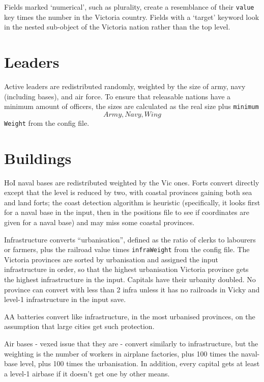 \documentclass[12pt,ebook,oneside]{book}
\begin{document}
Fields marked `numerical', such as plurality, create a resemblance of
their \texttt{value} key times the number in the Victoria
country. Fields with a `target' keyword look in the nested sub-object of
the Victoria nation rather than the top level. 

\section{Leaders}

Active leaders are redistributed randomly, weighted by the size of
army, navy (including bases), and air force. To ensure that releasable
nations have a minimum amount of officers, the sizes are calculated as
the real size plus \texttt{minimum\[Army,Navy,Wing\]Weight} from the
config file. 

\section{Buildings}

HoI naval bases are redistributed weighted by the Vic ones. Forts
convert directly except that the level is reduced by two, with coastal provinces gaining both sea and land
forts; the coast detection algorithm is heuristic
(specifically, it looks first for a naval base in the input, then in
the positions file to see if coordinates are given for a naval base)
and may miss some coastal provinces. 

Infrastructure converts ``urbanisation'', defined
as the ratio of clerks to labourers or farmers, plus the railroad
value times \texttt{infraWeight} from the config file. The Victoria provinces
are sorted by urbanisation and assigned the input
infrastructure in order, so that the highest urbanisation
Victoria province gets the highest infrastructure in the
input. Capitals have their urbanity doubled. No province can convert
with less than 2 infra unless it has no railroads in Vicky and level-1
infrastructure in the input save. 

AA batteries convert like infrastructure, in the most urbanised
provinces, on the assumption that large cities get such protection. 

Air bases - vexed issue that they are - convert similarly to
infrastructure, but the weighting is the number of workers in airplane
factories, plus 100 times the naval-base level, plus 100 times the
urbanisation. In addition, every capital gets at least a level-1
airbase if it doesn't get one by other means. 
\end{document}
